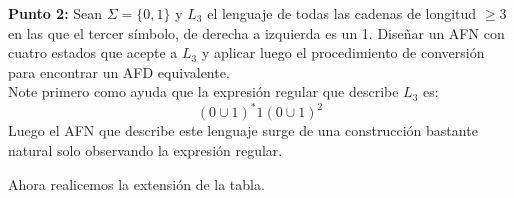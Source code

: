     \textbf{Punto 2: }Sean $\Sigma=\{0,1\}$ y $L_3$ el lenguaje de todas las cadenas de longitud $\geq3$ en las que el tercer símbolo, de derecha a izquierda es un 1. Diseñar un AFN con cuatro estados que acepte a $L_3$ y aplicar luego el procedimiento de conversión para encontrar un AFD equivalente.\\

Note primero como ayuda que la expresión regular que describe $L_3$ es:
$$(0\cup1)^*1(0\cup1)^2$$
 Luego el AFN que describe este lenguaje surge de una construcción bastante natural solo observando la expresión regular.
 
 \begin{basedtikz}
 \centering
\end{basedtikz}

Ahora realicemos la extensión de la tabla.

